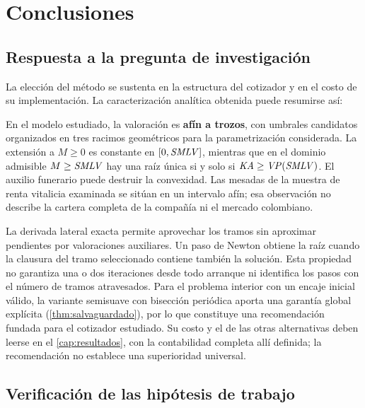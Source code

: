 \chapter{Conclusiones}
\label{cap:conclusiones}

\section{Respuesta a la pregunta de investigación}

La elección del método se sustenta en la estructura del cotizador y en el costo de
su implementación. La caracterización analítica obtenida puede resumirse así:

\begin{aporte}
En el modelo estudiado, la valoración es \textbf{afín a trozos}, con umbrales
candidatos organizados en tres racimos geométricos para la parametrización
considerada. La extensión a $M\ge0$ es constante en $[0,\mathit{SMLV}]$, mientras que en
el dominio admisible $M\ge\mathit{SMLV}$ hay una raíz única si y solo si
$\mathit{KA}\ge\mathit{VP}(\mathit{SMLV})$. El auxilio funerario puede destruir la convexidad. Las
mesadas de la muestra de renta vitalicia examinada se sitúan en un intervalo
afín; esa observación no describe la cartera completa de la compañía ni el
mercado colombiano.
\end{aporte}

La derivada lateral exacta permite aprovechar los tramos sin aproximar pendientes
por valoraciones auxiliares. Un paso de Newton obtiene la raíz cuando la clausura
del tramo seleccionado contiene también la solución. Esta propiedad no garantiza
una o dos iteraciones desde todo arranque ni identifica los pasos con el número
de tramos atravesados. Para el problema interior con un encaje inicial válido, la
variante semisuave con bisección periódica aporta una garantía global explícita
(\cref{thm:salvaguardado}), por lo que constituye una recomendación fundada para
el cotizador estudiado. Su costo y el de las otras alternativas deben leerse en
el \cref{cap:resultados}, con la contabilidad completa allí definida; la
recomendación no establece una superioridad universal.

\section{Verificación de las hipótesis de trabajo}

